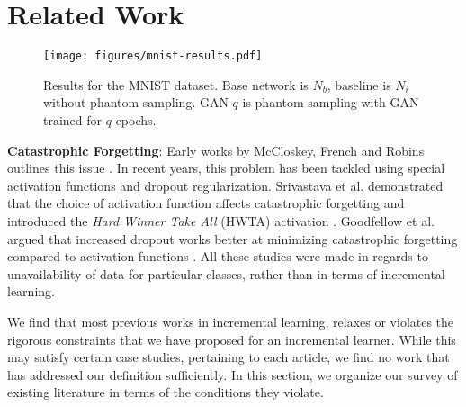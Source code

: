 \documentclass[10pt,twocolumn,letterpaper]{article}
\begin{document}
	
	
	
	
	
	
	
	
	
	
	
	
	
	\section{Related Work}
	\label{sec:lit}
	\begin{figure*}[!ht]
		\begin{center}
			\texttt{[image: figures/mnist-results.pdf]}
		\end{center}
		
		\caption{Results for the MNIST dataset. Base network is $N_b$, baseline is $N_i$ without phantom sampling. GAN $q$ is phantom sampling with GAN trained for $q$ epochs.}
		
		\label{fig:mnist-results}
	\end{figure*}
	\noindent\textbf{Catastrophic Forgetting}:
	Early works by McCloskey, French and Robins outlines this issue \cite{mccloskey1989catastrophic, french1993catastrophic, robins1995catastrophic}. 
	In recent years, this problem has been tackled using special activation functions and dropout regularization. 
	Srivastava et al. demonstrated that the choice of activation function affects catastrophic forgetting and introduced the \emph{Hard Winner Take All} (HWTA) activation \cite{srivastava2013compete}. 
	Goodfellow et al. argued that increased dropout works better at minimizing catastrophic forgetting compared to activation functions \cite{goodfellow2013empirical}. 
	All these studies were made in regards to unavailability of data for particular classes, rather than in terms of incremental learning.
	
	We find that most previous works in incremental learning, relaxes or violates the rigorous constraints that we have proposed for an incremental learner. While this may satisfy certain case studies, pertaining to each article, we find no work that has addressed our definition sufficiently. In this section, we organize our survey of existing literature in terms of the conditions they violate.
	
\end{document}
